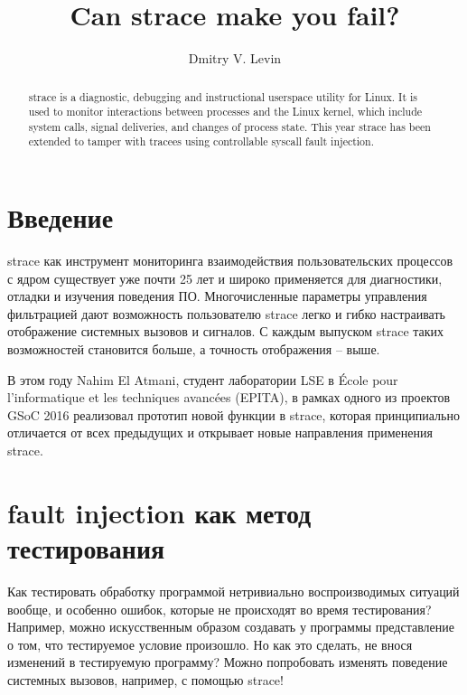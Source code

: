 
\author{Dmitry V. Levin}
\title{Can strace make you fail?}

\maketitle

\begin{abstract}
strace is a diagnostic, debugging and instructional userspace utility
for Linux.  It is used to monitor interactions between processes and the
Linux kernel, which include system calls, signal deliveries, and changes
of process state.  This year strace has been extended to tamper with
tracees using controllable syscall fault injection.
\end{abstract}

\section{Введение}

strace как инструмент мониторинга взаимодействия пользовательских
процессов с ядром существует уже почти 25 лет и широко применяется для
диагностики, отладки и изучения поведения ПО.  Многочисленные параметры
управления фильтрацией дают возможность пользователю strace легко и
гибко настраивать отображение системных вызовов и сигналов.  С каждым
выпуском strace таких возможностей становится больше, а точность
отображения -- выше.

В этом году Nahim El Atmani, студент лаборатории LSE в École pour
l'informatique et les techniques avancées (EPITA), в рамках одного из
проектов GSoC 2016\cite{gsoc} реализовал прототип новой
функции\cite{nahim} в strace, которая принципиально отличается от всех
предыдущих и открывает новые направления применения strace.

\section{fault injection как метод тестирования}

Как тестировать обработку программой нетривиально воспроизводимых
ситуаций вообще, и особенно ошибок, которые не происходят во время
тестирования?  Например, можно искусственным образом создавать у
программы представление о том, что тестируемое условие произошло.  Но
как это сделать, не внося изменений в тестируемую программу?  Можно
попробовать изменять поведение системных вызовов, например, с помощью
strace!

